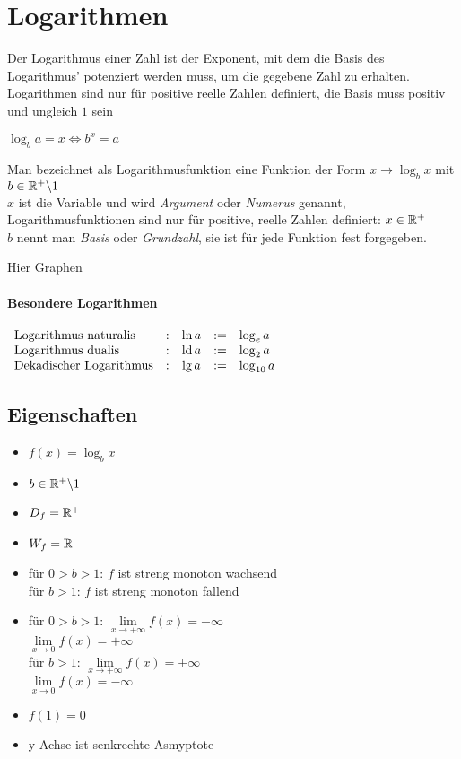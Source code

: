 \documentclass[../MAIN/main.tex]{subfiles}
\begin{document}
\chapter{Logarithmen}

\begin{Definition}
Der Logarithmus einer Zahl ist der Exponent, mit dem die Basis des Logarithmus' potenziert werden muss, um die gegebene Zahl zu erhalten. Logarithmen sind nur für positive reelle Zahlen definiert, die Basis muss positiv und ungleich $1$  sein
\begin{center}
$\log_ba=x\Leftrightarrow b^x=a$
\end{center}
\end{Definition}

\begin{Definition}
Man bezeichnet als Logarithmusfunktion eine Funktion der Form $x\rightarrow \log_bx$ mit $b\in \mathbb{R}^+\backslash 1$\\
$x$ ist die Variable und wird \textit{Argument} oder \textit{Numerus} genannt, Logarithmusfunktionen sind nur für positive, reelle Zahlen definiert: $x\in\mathbb{R}^+$\\
$b$ nennt man \textit{Basis} oder \textit{Grundzahl}, sie ist für jede Funktion fest forgegeben.\\
\end{Definition}

Hier Graphen
\subsubsection{Besondere Logarithmen}

$\begin{array}{lcccl}
\mbox{Logarithmus naturalis}&:&\ln a&:=&\log_ea\\
\mbox{Logarithmus dualis}&:&\operatorname{ld} a&:=&\log_2a\\
\mbox{Dekadischer Logarithmus}&:&\lg a&:=&\log_{10}a
\end{array}$
\\
	\section{Eigenschaften}

\begin{itemize}
\item$f(x)=\log_bx$
\item$b\in\mathbb{R}^+\backslash 1$
\item$D_f=\mathbb{R}^+$
\item$W_f=\mathbb{R}$
\item für $0>b>1$: $f$ ist streng monoton wachsend\\
für $b>1$: $f$ ist streng monoton fallend
\item für $0>b>1$: $\lim\limits_{x\to +\infty}f(x)=-\infty$\\
			$\lim\limits_{x\to 0}f(x)=+\infty$\\
für $b>1$: $\lim\limits_{x\to +\infty}f(x)=+\infty$\\
	        $\lim\limits_{x\to 0}f(x)=-\infty$
\item $f(1)=0$
\item y-Achse ist senkrechte Asmyptote
\end{itemize}
\end{document}
